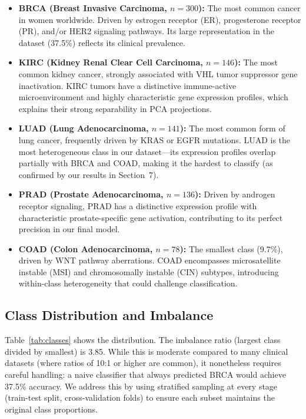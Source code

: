 \documentclass{article}
\begin{document}
\begin{itemize}[leftmargin=2em]
\item \textbf{BRCA (Breast Invasive Carcinoma, $n=300$):} The most common cancer in women worldwide. Driven by estrogen receptor (ER), progesterone receptor (PR), and/or HER2 signaling pathways. Its large representation in the dataset (37.5\%) reflects its clinical prevalence.

\item \textbf{KIRC (Kidney Renal Clear Cell Carcinoma, $n=146$):} The most common kidney cancer, strongly associated with VHL tumor suppressor gene inactivation. KIRC tumors have a distinctive immune-active microenvironment and highly characteristic gene expression profiles, which explains their strong separability in PCA projections.

\item \textbf{LUAD (Lung Adenocarcinoma, $n=141$):} The most common form of lung cancer, frequently driven by KRAS or EGFR mutations. LUAD is the most heterogeneous class in our dataset---its expression profiles overlap partially with BRCA and COAD, making it the hardest to classify (as confirmed by our results in Section~7).

\item \textbf{PRAD (Prostate Adenocarcinoma, $n=136$):} Driven by androgen receptor signaling, PRAD has a distinctive expression profile with characteristic prostate-specific gene activation, contributing to its perfect precision in our final model.

\item \textbf{COAD (Colon Adenocarcinoma, $n=78$):} The smallest class (9.7\%), driven by WNT pathway aberrations. COAD encompasses microsatellite instable (MSI) and chromosomally instable (CIN) subtypes, introducing within-class heterogeneity that could challenge classification.
\end{itemize}

\subsection{Class Distribution and Imbalance}
Table~\ref{tab:classes} shows the distribution. The imbalance ratio (largest class divided by smallest) is 3.85. While this is moderate compared to many clinical datasets (where ratios of 10:1 or higher are common), it nonetheless requires careful handling: a naive classifier that always predicted BRCA would achieve 37.5\% accuracy. We address this by using stratified sampling at every stage (train-test split, cross-validation folds) to ensure each subset maintains the original class proportions.
\end{document}
